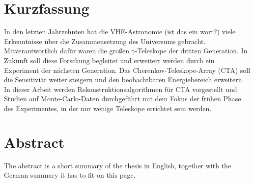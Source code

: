 \thispagestyle{plain}

\section*{Kurzfassung}
In den letzten Jahrzehnten hat die VHE-Astronomie (ist das ein wort?) 
viele Erkenntnisse über die Zusammensetzung des Universums gebracht.
Mitverantwortlich dafür waren die großen $\gamma$-Teleskope der 
dritten Generation. In Zukunft soll diese Forschung begleitet und erweitert werden 
durch ein Experiment der nächsten Generation.
Das Cherenkov-Teleskope-Array (CTA) soll die Sensitiviät weiter steigern und den
beobachtbaren Energiebereich erweitern.
In dieser Arbeit werden Rekonstruktionsalgorithmen für CTA vorgestellt und Studien auf 
Monte-Carlo-Daten durchgeführt mit dem Fokus der frühen Phase des Experimentes, 
in der nur wenige Teleskope errichtet sein werden.


\section*{Abstract}
\begin{english}
The abstract is a short summary of the thesis in English, together with the German summary it has to fit on this page.
\end{english}

